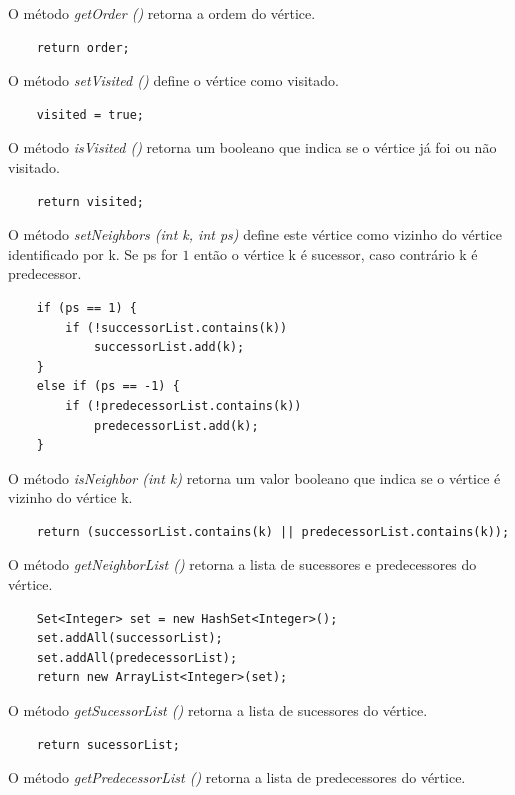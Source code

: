 \documentclass[a4paper,12pt]{report}
\begin{document}
O método \textit{getOrder ()} retorna a ordem do vértice.

\begin{lstlisting}
    return order;
\end{lstlisting}

O método \textit{setVisited ()} define o vértice como visitado.

\begin{lstlisting}
    visited = true;
\end{lstlisting}

O método \textit{isVisited ()} retorna um booleano que indica se o vértice já foi ou não visitado.

\begin{lstlisting}
    return visited;
\end{lstlisting}

O método \textit{setNeighbors (int k, int ps)} define este vértice como vizinho do vértice identificado por k. Se ps for $1$ então o vértice k é sucessor, caso contrário k é predecessor.

\begin{lstlisting}
    if (ps == 1) {
        if (!successorList.contains(k))
            successorList.add(k);
    }
    else if (ps == -1) {
        if (!predecessorList.contains(k))
            predecessorList.add(k);
    }
\end{lstlisting}

O método \textit{isNeighbor (int k)} retorna um valor booleano que indica se o vértice é vizinho do vértice k.

\begin{lstlisting}
    return (successorList.contains(k) || predecessorList.contains(k));
\end{lstlisting}

O método \textit{getNeighborList ()} retorna a lista de sucessores e predecessores do vértice.

\begin{lstlisting}
    Set<Integer> set = new HashSet<Integer>();
    set.addAll(successorList);
    set.addAll(predecessorList);
    return new ArrayList<Integer>(set);
\end{lstlisting}

O método \textit{getSucessorList ()} retorna a lista de sucessores do vértice.

\begin{lstlisting}
    return sucessorList;
\end{lstlisting}

O método \textit{getPredecessorList ()} retorna a lista de predecessores do vértice.
\end{document}
